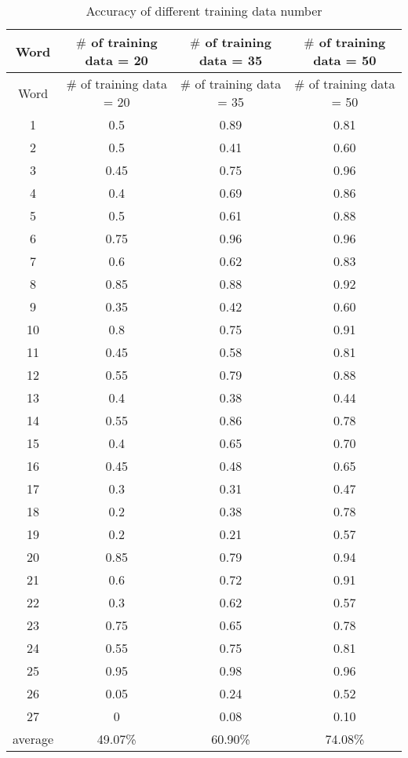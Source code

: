 \begin{longtable}[c]{|c|c|c|c|}
\caption{Accuracy of different training data number\label{table 2}}\\

\hline
Word & $\#$ of training data = 20 &$\#$ of training data = 35 &$\#$ of training data = 50 \\
\hline
\endfirsthead

\hline
Word & $\#$ of training data = 20 &$\#$ of training data = 35 &$\#$ of training data = 50 \\
\hline
\endhead

\hline
\endfoot

\hline
\endlastfoot

1& 0.5&0.89 &0.81 \\
\hline
2& 0.5&0.41 &0.60 \\
\hline
3& 0.45& 0.75&0.96 \\
\hline
4& 0.4&0.69 &0.86 \\
\hline
5& 0.5& 0.61& 0.88\\
\hline
6& 0.75& 0.96 &0.96 \\
\hline
7& 0.6&0.62 &0.83 \\
\hline
8& 0.85&0.88 &0.92 \\
\hline
9& 0.35&0.42 &0.60 \\
\hline
10& 0.8& 0.75& 0.91\\
\hline
11& 0.45& 0.58& 0.81\\
\hline
12& 0.55& 0.79&0.88 \\
\hline
13& 0.4&0.38 &0.44 \\
\hline
14& 0.55&0.86 &0.78 \\
\hline
15& 0.4& 0.65&0.70 \\
\hline
16& 0.45&0.48 &0.65 \\
\hline
17& 0.3& 0.31& 0.47\\
\hline
18& 0.2& 0.38&0.78 \\
\hline
19& 0.2& 0.21&0.57 \\
\hline
20& 0.85& 0.79&0.94 \\
\hline
21& 0.6& 0.72& 0.91\\
\hline
22& 0.3& 0.62& 0.57\\
\hline
23& 0.75&0.65 &0.78 \\
\hline
24& 0.55& 0.75&0.81 \\
\hline
25& 0.95&0.98 &0.96 \\
\hline
26& 0.05& 0.24& 0.52\\
\hline
27& 0& 0.08& 0.10\\
\hline
average & 49.07\% & 60.90\% & 74.08\% \\
\end{longtable}

